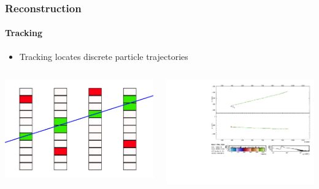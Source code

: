 \documentclass[10pt,professionalfonts,xcolor=table]{beamer}
\begin{document}
\begin{frame}

\frametitle{Reconstruction}
\framesubtitle{Tracking}

\begin{itemize}
\item Tracking locates discrete particle trajectories
\end{itemize}
\gap
\gap
\gap
\begin{columns}[c]
\centering
\includegraphics[width=\textwidth]{figures/figures/tracking.jpg}

\centering
\includegraphics[height=\textwidth, angle=-90]{figures/evd_steps/evd_track_zoom.pdf}

\end{columns}

\end{frame}
\end{document}
